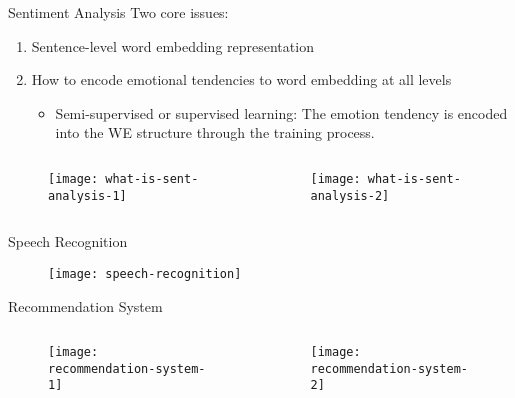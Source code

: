 \begin{frame}{Sentiment Analysis}
Two core issues:
\begin{enumerate}
\item Sentence-level word embedding representation
\item How to encode emotional tendencies to word embedding at all levels
\begin{itemize}
\item Semi-supervised or supervised learning: The emotion tendency is encoded into the WE structure through the training process.
\end{itemize}
\end{enumerate}
\begin{columns}[t]
\begin{column}{.5\textwidth}
\begin{figure}[!]
\centering
\texttt{[image: what-is-sent-analysis-1]}
\end{figure}
\end{column}
\begin{column}{.5\textwidth}
\begin{figure}[!]
\centering
\texttt{[image: what-is-sent-analysis-2]}
\end{figure}
\end{column}
\end{columns}
\end{frame}

\begin{frame}{Speech Recognition}
\begin{figure}[!]
\centering
\texttt{[image: speech-recognition]}
\end{figure}
\end{frame}

\begin{frame}{Recommendation System}
\begin{columns}[t]
\begin{column}{.5\textwidth}
\begin{figure}[!]
\centering
\texttt{[image: recommendation-system-1]}
\end{figure}
\end{column}
\begin{column}{.5\textwidth}
\begin{figure}[!]
\centering
\texttt{[image: recommendation-system-2]}
\end{figure}
\end{column}
\end{columns}
\end{frame}





